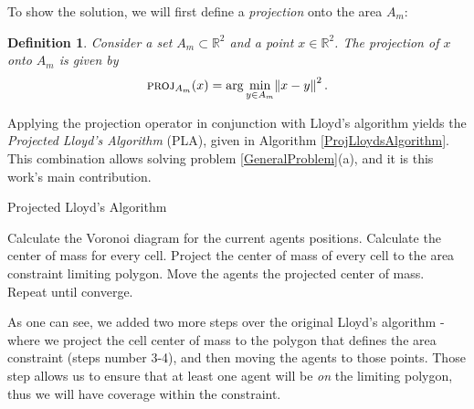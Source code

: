 \documentclass{iacas}
\newtheorem{definition}{Definition}
\begin{document}
To show the solution, we will first define a \emph{projection} onto the area $A_m$:
\begin{definition}
Consider a set $A_m \subset \mathbb{R}^2$ and a point $x \in \mathbb{R}^2$.  The \emph{projection} of $x$ onto $A_m$ is given by
$$\textsc{proj}_{A_m}(x) = \arg\min_{y \in A_m} \norm{x-y}^2.$$
\label{def:projection operator}
\end{definition}

Applying the projection operator in conjunction with Lloyd's algorithm yields the \emph{Projected Lloyd's Algorithm} (PLA), given in Algorithm \ref{ProjLloydsAlgorithm}. This combination allows solving problem \ref{GeneralProblem}(a), and it is this work's main contribution.%
\begin{algorithm}
\caption{Projected Lloyd's Algorithm}\label{ProjLloydsAlgorithm}
\begin{algorithmic}[1]
\State Calculate the Voronoi diagram for the current agents positions.
\State Calculate the center of mass for every cell.
\State Project the center of mass of every cell to the area constraint limiting polygon.
\State Move the agents the projected center of mass.
\State Repeat until converge.
\end{algorithmic}
\label{algo:PLA}
\end{algorithm}

As one can see, we added two more steps over the original Lloyd's algorithm - where we project the cell center of mass to the polygon that defines the area constraint (steps number 3-4), and then moving the agents to those points. Those step allows us to ensure that at least one agent will be \emph{on} the limiting polygon, thus we will have coverage within the constraint.
\end{document}

